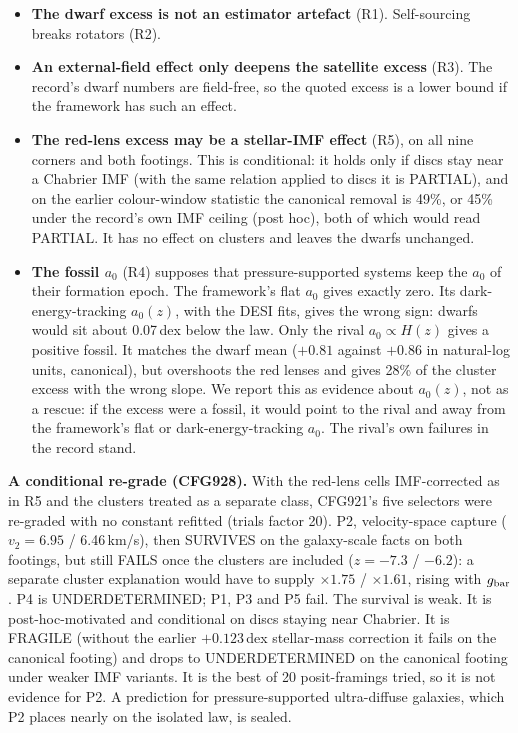 \documentclass[10pt]{article}
\begin{document}
\begin{itemize}
\item \textbf{The dwarf excess is not an estimator artefact} (R1). Self-sourcing breaks rotators (R2).
\item \textbf{An external-field effect only deepens the satellite excess} (R3). The record's dwarf numbers are field-free, so the quoted excess is a lower bound if the framework has such an effect.
\item \textbf{The red-lens excess may be a stellar-IMF effect} (R5), on all nine corners and both footings. This is conditional: it holds only if discs stay near a Chabrier IMF (with the same relation applied to discs it is PARTIAL), and on the earlier colour-window statistic the canonical removal is 49\%, or 45\% under the record's own IMF ceiling (post hoc), both of which would read PARTIAL. It has no effect on clusters and leaves the dwarfs unchanged.
\item \textbf{The fossil $a_0$} (R4) supposes that pressure-supported systems keep the $a_0$ of their formation epoch. The framework's flat $a_0$ gives exactly zero. Its dark-energy-tracking $a_0(z)$, with the DESI fits, gives the wrong sign: dwarfs would sit about 0.07\,dex below the law. Only the rival $a_0\propto H(z)$ gives a positive fossil. It matches the dwarf mean ($+0.81$ against $+0.86$ in natural-log units, canonical), but overshoots the red lenses and gives 28\% of the cluster excess with the wrong slope. We report this as evidence about $a_0(z)$, not as a rescue: if the excess were a fossil, it would point to the rival and away from the framework's flat or dark-energy-tracking $a_0$. The rival's own failures in the record stand.
\end{itemize}

\textbf{A conditional re-grade (CFG928).} With the red-lens cells IMF-corrected as in R5 and the clusters treated as a separate class, CFG921's five selectors were re-graded with no constant refitted (trials factor 20). P2, velocity-space capture ($v_2=6.95$ / 6.46\,km/s), then SURVIVES on the galaxy-scale facts on both footings, but still FAILS once the clusters are included ($z=-7.3$ / $-6.2$): a separate cluster explanation would have to supply $\times1.75$ / $\times1.61$, rising with $g_{\rm bar}$. P4 is UNDERDETERMINED; P1, P3 and P5 fail. The survival is weak. It is post-hoc-motivated and conditional on discs staying near Chabrier. It is FRAGILE (without the earlier $+0.123$\,dex stellar-mass correction it fails on the canonical footing) and drops to UNDERDETERMINED on the canonical footing under weaker IMF variants. It is the best of 20 posit-framings tried, so it is not evidence for P2. A prediction for pressure-supported ultra-diffuse galaxies, which P2 places nearly on the isolated law, is sealed.
\end{document}
